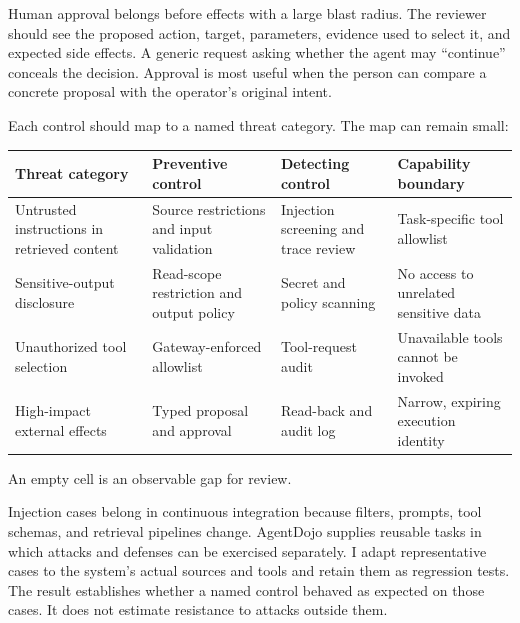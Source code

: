 Human approval belongs before effects with a large blast radius. The reviewer should see the proposed action, target, parameters, evidence used to select it, and expected side effects. A generic request asking whether the agent may ``continue'' conceals the decision. Approval is most useful when the person can compare a concrete proposal with the operator's original intent.

Each control should map to a named threat category. The map can remain small:

\begin{longtable}[]{@{}
  >{\raggedright\arraybackslash}p{}
  >{\raggedright\arraybackslash}p{}
  >{\raggedright\arraybackslash}p{}
  >{\raggedright\arraybackslash}p{}@{}}
\toprule\noalign{}
\begin{minipage}[b]{\linewidth}\raggedright
Threat category
\end{minipage} & \begin{minipage}[b]{\linewidth}\raggedright
Preventive control
\end{minipage} & \begin{minipage}[b]{\linewidth}\raggedright
Detecting control
\end{minipage} & \begin{minipage}[b]{\linewidth}\raggedright
Capability boundary
\end{minipage} \\
\midrule\noalign{}
\endhead
\bottomrule\noalign{}
\endlastfoot
Untrusted instructions in retrieved content & Source restrictions and input validation & Injection screening and trace review & Task-specific tool allowlist \\
Sensitive-output disclosure & Read-scope restriction and output policy & Secret and policy scanning & No access to unrelated sensitive data \\
Unauthorized tool selection & Gateway-enforced allowlist & Tool-request audit & Unavailable tools cannot be invoked \\
High-impact external effects & Typed proposal and approval & Read-back and audit log & Narrow, expiring execution identity \\
\end{longtable}

An empty cell is an observable gap for review.

Injection cases belong in continuous integration because filters, prompts, tool schemas, and retrieval pipelines change. AgentDojo supplies reusable tasks in which attacks and defenses can be exercised separately. I adapt representative cases to the system's actual sources and tools and retain them as regression tests. The result establishes whether a named control behaved as expected on those cases. It does not estimate resistance to attacks outside them.

